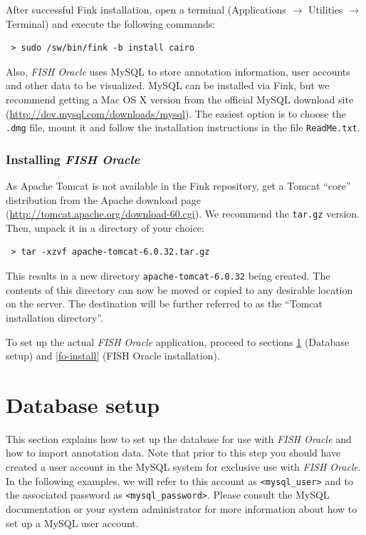 \documentclass[11pt,final]{article}
\newcommand{\FO}[0]{\emph{FISH Oracle}\xspace}
\begin{document}
After successful Fink installation, open a terminal
(Applications $\rightarrow$ Utilities $\rightarrow$ Terminal)
and execute the following commands:

\begin{lstlisting}
 > sudo /sw/bin/fink -b install cairo
\end{lstlisting}

Also, \FO uses MySQL to store annotation information, user accounts and
other data to be visualized. MySQL can be installed via Fink, but we recommend
getting a Mac OS X version from the official MySQL download site
(\url{http://dev.mysql.com/downloads/mysql}). The easiest option is to choose
the \texttt{.dmg} file, mount it and follow the installation instructions in
the file \texttt{ReadMe.txt}.


\subsubsection*{Installing \FO}

As Apache Tomcat is not available in the Fink repository, get a Tomcat
``core'' distribution from the Apache download page
(\url{http://tomcat.apache.org/download-60.cgi}). We recommend the
\texttt{tar.gz} version. Then, unpack it in a directory of your choice:

\begin{lstlisting}
 > tar -xzvf apache-tomcat-6.0.32.tar.gz
\end{lstlisting}

This results in a new directory \texttt{apache-tomcat-6.0.32} being created.
The contents of this directory can now be moved or copied to any desirable
location on the server. The destination will be further referred to as the
``Tomcat installation directory''.

To set up the actual \FO application, proceed to sections \ref{db-setup}
(Database setup) and \ref{fo-install} (FISH Oracle installation).

\section{Database setup}
\label{db-setup}

This section explains how to set up the database for use with \FO and how to
import annotation data. Note that prior to this step you should have created a
user account in the MySQL system for exclusive use with \FO. In the following
examples, we will refer to this account as \texttt{<mysql\_user>} and to the
associated password as \texttt{<mysql\_password>}. Please consult the MySQL
documentation or your system administrator for more information about how to
set up a MySQL user account.
\end{document}
